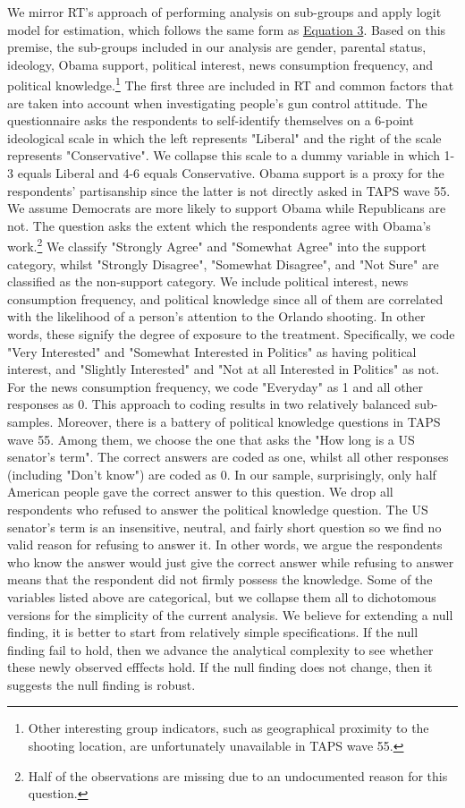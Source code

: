 \documentclass[11pt]{article}
\begin{document}
We mirror RT’s approach of performing analysis on sub-groups and apply logit model for estimation, which follows the same form as \hyperref[eq3]{Equation 3}. Based on this premise, the sub-groups included in our analysis are gender, parental status, ideology, Obama support, political interest, news consumption frequency, and political knowledge.\footnote{Other interesting group indicators, such as geographical proximity to the shooting location, are unfortunately unavailable in TAPS wave 55.} The first three are included in RT and common factors that are taken into account when investigating people’s gun control attitude. The questionnaire asks the respondents to self-identify themselves on a 6-point ideological scale in which the left represents "Liberal" and the right of the scale represents "Conservative". We collapse this scale to a dummy variable in which 1-3 equals Liberal and 4-6 equals Conservative. Obama support is a proxy for the respondents’ partisanship since the latter is not directly asked in TAPS wave 55. We assume Democrats are more likely to support Obama while Republicans are not. The question asks the extent which the respondents agree with Obama’s work.\footnote{Half of the observations are missing due to an undocumented reason for this question.} We classify "Strongly Agree" and "Somewhat Agree" into the support category, whilst "Strongly Disagree", "Somewhat Disagree", and "Not Sure" are classified as the non-support category. We include political interest, news consumption frequency, and political knowledge since all of them are correlated with the likelihood of a person’s attention to the Orlando shooting. In other words, these signify the degree of exposure to the treatment. Specifically, we code "Very Interested" and "Somewhat Interested in Politics" as having political interest, and "Slightly Interested" and "Not at all Interested in Politics" as not. For the news consumption frequency, we code "Everyday" as 1 and all other responses as 0. This approach to coding results in two relatively balanced sub-samples. Moreover, there is a battery of political knowledge questions in TAPS wave 55. Among them, we choose the one that asks the "How long is a US senator’s term". The correct answers are coded as one, whilst all other responses (including "Don’t know") are coded as 0. In our sample, surprisingly, only half American people gave the correct answer to this question. We drop all respondents who refused to answer the political knowledge question. The US senator’s term is an insensitive, neutral, and fairly short question so we find no valid reason for refusing to answer it. In other words, we argue the respondents who know the answer would just give the correct answer while refusing to answer means that the respondent did not firmly possess the knowledge. Some of the variables listed above are categorical, but we collapse them all to dichotomous versions for the simplicity of the current analysis. We believe for extending a null finding, it is better to start from relatively simple specifications. If the null finding fail to hold, then we advance the analytical complexity to see whether these newly observed efffects hold. If the null finding does not change, then it suggests the null finding is robust.
\end{document}
